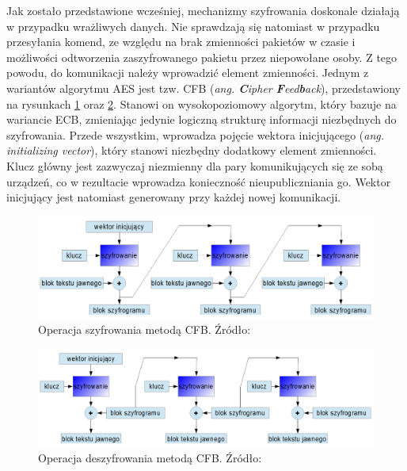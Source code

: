 Jak zostało przedstawione wcześniej, mechanizmy szyfrowania doskonale działają w przypadku wrażliwych danych. Nie sprawdzają się natomiast w przypadku przesyłania komend, ze względu na brak zmienności pakietów w czasie i możliwości odtworzenia zaszyfrowanego pakietu przez niepowołane osoby. Z tego powodu, do komunikacji należy wprowadzić element zmienności.
Jednym z wariantów algorytmu AES jest tzw. CFB (\textit{ang. \textbf{C}ipher \textbf{F}eed\textbf{b}ack}), przedstawiony na rysunkach \ref{fig:image_cfb_encrypt} oraz \ref{fig:image_cfb_decrypt}. Stanowi on wysokopoziomowy algorytm, który bazuje na wariancie ECB, zmieniając jedynie logiczną strukturę informacji niezbędnych do szyfrowania. Przede wszystkim, wprowadza pojęcie wektora inicjującego (\textit{ang. initializing vector}), który stanowi niezbędny dodatkowy element zmienności. Klucz główny jest zazwyczaj niezmienny dla pary komunikujących się ze sobą urządzeń, co w rezultacie wprowadza konieczność nieupubliczniania go. Wektor inicjujący jest natomiast generowany przy każdej nowej komunikacji. 

	\begin{figure}[h]
		\centering
		\includegraphics[width=15cm]{img/com_security/CFB_szyfrowanie.png}
		\caption{Operacja szyfrowania metodą CFB. Źródło: \cite{aes_cryptoit}}
		\label{fig:image_cfb_encrypt}
	\end{figure}
	
	\begin{figure}[h]
		\centering
		\includegraphics[width=15cm]{img/com_security/CFB_deszyfrowanie.png}
		\caption{Operacja deszyfrowania metodą CFB. Źródło: \cite{aes_cryptoit}}
		\label{fig:image_cfb_decrypt}
	\end{figure}
	

